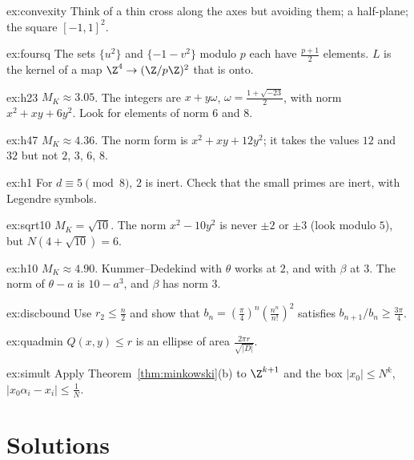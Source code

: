 \begin{hint}{ex:convexity}
Think of a thin cross along the axes but avoiding them; a half-plane; the square $[-1,1]^2$.
\end{hint}
\begin{hint}{ex:foursq}
The sets $\{u^2\}$ and $\{-1-v^2\}$ modulo $p$ each have $\frac{p+1}2$ elements. $L$ is the kernel of a map
$\Z^4\to(\Z/p\Z)^2$ that is onto.
\end{hint}
\begin{hint}{ex:h23}
$M_K\approx3.05$. The integers are $x+y\omega$, $\omega=\frac{1+\sqrt{-23}}2$, with norm $x^2+xy+6y^2$. Look for elements
of norm $6$ and $8$.
\end{hint}
\begin{hint}{ex:h47}
$M_K\approx4.36$. The norm form is $x^2+xy+12y^2$; it takes the values $12$ and $32$ but not $2$, $3$, $6$, $8$.
\end{hint}
\begin{hint}{ex:h1}
For $d\equiv5\pmod8$, $2$ is inert. Check that the small primes are inert, with Legendre symbols.
\end{hint}
\begin{hint}{ex:sqrt10}
$M_K=\sqrt{10}$. The norm $x^2-10y^2$ is never $\pm2$ or $\pm3$ (look modulo $5$), but $N(4+\sqrt{10})=6$.
\end{hint}
\begin{hint}{ex:h10}
$M_K\approx4.90$. Kummer--Dedekind with $\theta$ works at $2$, and with $\beta$ at $3$. The norm of $\theta-a$ is
$10-a^3$, and $\beta$ has norm $3$.
\end{hint}
\begin{hint}{ex:discbound}
Use $r_2\le\frac n2$ and show that $b_n=(\frac\pi4)^n(\frac{n^n}{n!})^2$ satisfies $b_{n+1}/b_n\ge\frac{3\pi}4$.
\end{hint}
\begin{hint}{ex:quadmin}
$Q(x,y)\le r$ is an ellipse of area $\frac{2\pi r}{\sqrt{|D|}}$.
\end{hint}
\begin{hint}{ex:simult}
Apply Theorem~\ref{thm:minkowski}(b) to $\Z^{k+1}$ and the box $|x_0|\le N^k$, $|x_0\alpha_i-x_i|\le\frac1N$.
\end{hint}

\section{Solutions}

